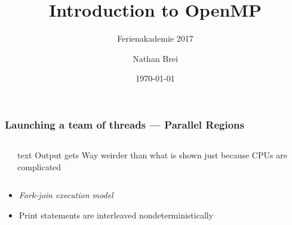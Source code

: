 \documentclass[handout]{beamer}
\title{Introduction to OpenMP}
\subtitle{Ferienakademie 2017}
\author{Nathan Brei}
\institute{}
\date\today
\begin{document}
\begin{frame}
  \titlepage
\end{frame}

\begin{frame}[fragile]
  \frametitle{Launching a team of threads --- Parallel Regions}
  \begin{columns}[t]%
    \begin{column}{0.65\textwidth}
    \end{column}
    \pause
    \begin{column}{0.4\textwidth}
      \begin{ccode}[gobble=8]{text}
        Output gets
        Way weirder than what
        is shown just because
        CPUs are complicated
      \end{ccode}
    \end{column}
  \end{columns}
  \pause
  \begin{itemize}
  \item \emph{Fork-join execution model}
  \item Print statements are interleaved nondeterministically
  \end{itemize}
\end{frame}
\end{document}
